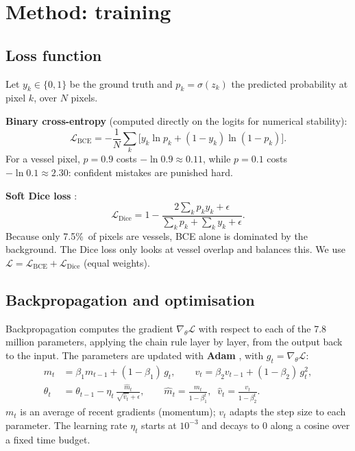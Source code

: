 \documentclass[11pt,a4paper]{article}
\newcommand{\pct}{\%}
\begin{document}
\section{Method: training}

\subsection{Loss function}
Let $y_k\in\{0,1\}$ be the ground truth and $p_k=\sigma(z_k)$ the predicted probability at pixel $k$, over $N$ pixels.

\textbf{Binary cross-entropy} (computed directly on the logits for numerical stability):
\begin{equation}
\mathcal{L}_{\text{BCE}} = -\frac{1}{N}\sum_{k}\Big[y_k\ln p_k + (1-y_k)\ln(1-p_k)\Big].
\end{equation}
For a vessel pixel, $p=0.9$ costs $-\ln 0.9\approx0.11$, while $p=0.1$ costs $-\ln0.1\approx2.30$: confident mistakes are punished hard.

\textbf{Soft Dice loss} \cite{vnet}:
\begin{equation}
\mathcal{L}_{\text{Dice}} = 1-\frac{2\sum_k p_k y_k + \epsilon}{\sum_k p_k + \sum_k y_k + \epsilon}.
\end{equation}
Because only 7.5\pct\ of pixels are vessels, BCE alone is dominated by the background. The Dice loss only looks at vessel overlap and balances this. We use $\mathcal{L}=\mathcal{L}_{\text{BCE}}+\mathcal{L}_{\text{Dice}}$ (equal weights).

\subsection{Backpropagation and optimisation}
Backpropagation computes the gradient $\nabla_\theta\mathcal{L}$ with respect to each of the 7.8 million parameters, applying the chain rule layer by layer, from the output back to the input. The parameters are updated with \textbf{Adam} \cite{adam}, with $g_t=\nabla_\theta\mathcal{L}$:
\begin{align}
m_t &= \beta_1 m_{t-1} + (1-\beta_1)\,g_t, \qquad v_t = \beta_2 v_{t-1} + (1-\beta_2)\,g_t^2,\\
\theta_t &= \theta_{t-1} - \eta_t\,\frac{\hat m_t}{\sqrt{\hat v_t}+\epsilon}, \qquad \hat m_t=\frac{m_t}{1-\beta_1^t},\;\; \hat v_t=\frac{v_t}{1-\beta_2^t}.
\end{align}
$m_t$ is an average of recent gradients (momentum); $v_t$ adapts the step size to each parameter. The learning rate $\eta_t$ starts at $10^{-3}$ and decays to 0 along a cosine over a fixed time budget.
\end{document}
